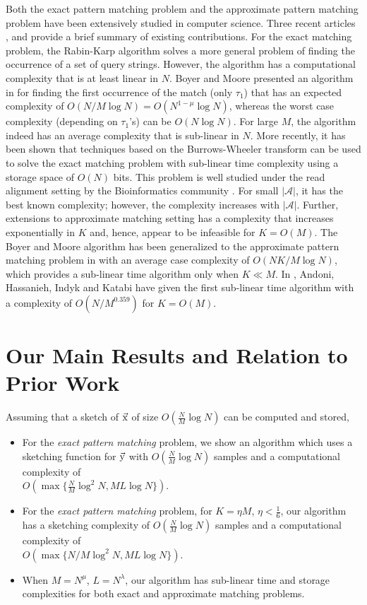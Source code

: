 Both the exact pattern matching problem and the approximate pattern matching problem have been extensively studied in computer science.
Three recent articles \cite{andoni2013shift}, \cite{amir2004faster} and \cite{navarro2001guided} provide a brief summary of existing contributions.
For the exact matching problem, the Rabin-Karp algorithm solves a more general problem of finding the occurrence of a set of query strings.
However, the algorithm has a computational complexity that is at least linear in $N$. Boyer and Moore presented an algorithm in \cite{boyer1977fast} for finding the first occurrence of the match (only $\tau_1$) that has an expected complexity of $O(N/M \log N) = O(N^{1-\mu} \log N)$, whereas the worst case complexity (depending on $\tau_1$'s) can be $O(N \log N)$. For large $M$, the algorithm indeed has an average complexity that is sub-linear in $N$. More recently, it has been shown that techniques based on the Burrows-Wheeler transform can be used to solve the exact matching problem with sub-linear time complexity \cite{ferragina2005indexing} using a storage space of $O(N)$ bits. This problem is well studied under the read alignment setting by the Bioinformatics community \cite{li2009fast,li2010fast}. For small $|\mathcal{A}|$, it has the best known complexity; however, the complexity increases with $|\mathcal{A}|$. Further, extensions to approximate matching setting \cite{zhang2003approximate} has a complexity that increases exponentially in $K$ and, hence, appear to be infeasible for $K = O(M)$. The Boyer and Moore algorithm has been generalized to the approximate pattern matching problem in \cite{chang1994approximate} with an average case complexity of $O(NK/M \log N)$, which provides a sub-linear time algorithm only when $K \ll M$. In \cite{andoni2013shift}, Andoni, Hassanieh, Indyk and Katabi have given the first sub-linear time algorithm with a complexity of $O(N/M^{0.359})$ for $K = O(M)$.

\section{Our Main Results and Relation to Prior Work}
\label{sec:mainresults}
Assuming that a sketch of $\vec{\mathrm{x}}$ of size $O(\frac{N}{M} \log N)$ can be computed and stored,
\begin{itemize}
\item For the {\it exact pattern matching} problem, we  show  an  algorithm  which  uses  a  sketching function for $\vec{\mathrm{y}}$ with $O(\frac{N}{M}\log N)$ samples and a computational complexity of \\$O\left(\max\{\frac{N}{M}\log^2 N, ML\log N \}\right)$. 
\item For the {\it exact pattern matching} problem, for $K= \eta M$, $\eta < \frac{1}{6}$, our algorithm has a sketching complexity of $O(\frac{N}{M}\log N)$ samples and a computational complexity of\\ $O\left(\max\{N/M\log^2 N, ML\log N \}\right)$.
\item When $M=N^\mu$, $L=N^\lambda$, our algorithm has sub-linear time and storage complexities for both exact and approximate matching problems.
\end{itemize}

